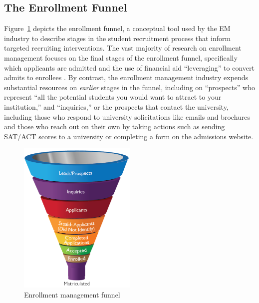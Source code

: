 \documentclass{article}
\begin{document}
\subsection*{The Enrollment Funnel}

Figure~\ref{fig:enrollment_funnel} depicts the enrollment funnel, a conceptual tool used by the EM industry to describe stages in the student recruitment process that inform targeted recruiting interventions. The vast majority of research on enrollment management focuses on the final stages of the enrollment funnel, specifically which applicants are admitted \citep{RN3536, RN3544, RN3523, RN4131} and the use of financial aid ``leveraging'' to convert admits to enrollees \citep{RN2241, RN3564, RN1948}. By contrast, the enrollment management industry expends substantial resources on \textit{earlier} stages in the funnel, including on ``prospects'' who represent ``all the potential students you would want to attract to your institution,'' \citep{RN4322} and ``inquiries,'' or the prospects that contact the university, including those who respond to university solicitations like emails and brochures and those who reach out on their own by taking actions such as sending SAT/ACT scores to a university or completing a form on the admissions website.

\begin{figure}[!ht]
    \centering
    \includegraphics[width=0.5\textwidth]{assets/images/enrollment_funnel.png}
    \caption{Enrollment management funnel}
    \label{fig:enrollment_funnel}
\end{figure}
\end{document}
